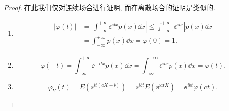 \begin{proof}
    在此我们仅对连续场合进行证明,
    而在离散场合的证明是类似的.
    \begin{enumerate}
        \item 
        \begin{align*}
            \lvert \varphi (t) \rvert & = \left\lvert \int_{-\infty}^{+\infty} \ee^{itx} p (x) \dd x \right\rvert 
            \leq \int_{-\infty}^{+\infty} \left\lvert \ee^{itx} \right\rvert p (x) \dd x\\
            & = \int_{-\infty}^{+\infty} p (x) \dd x
            = \varphi (0)
            = 1.
        \end{align*}
        \item 
        \begin{equation*}
            \varphi (-t) = \int_{-\infty}^{+\infty} \ee^{-itx} p (x) \dd x
            = \overline{\int_{-\infty}^{+\infty} \ee^{itx} p (x) \dd x}
            = \overline{\varphi (t)}.
        \end{equation*}
        \item
        \begin{equation*}
            \varphi_Y (t) = E ( \ee^{it (aX + b)} )
            = \ee^{ibt} E ( \ee^{iatX} ) = \ee^{ibt} \varphi (at).
        \end{equation*}
    \end{enumerate}
\end{proof}